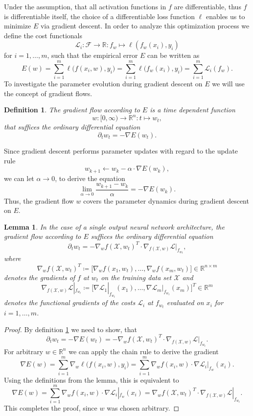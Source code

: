 \documentclass[11pt, a4paper]{article}
\newtheorem{lemma}[theorem]{Lemma}
\newtheorem{definition}[theorem]{Definition}
\newcommand{\R}{\mathds{R}}
\newcommand{\F}{\mathcal{F}}
\newcommand{\X}{\mathcal{X}}
\renewcommand{\L}{\mathcal{L}}
\begin{document}
Under the assumption, that all activation functions in $f$ are differentiable, thus $f$ is differentiable itself, the choice of a differentiable loss function $\ell$ enables us to minimize $E$ via gradient descent. In order to analyze this optimization process we define the cost functionals
\[ \L_i: \F \to \R : f_w \mapsto \ell(f_w(x_i),y_i) \]
for $i=1, \dots,m$, such that the empirical error $E$ can be written as
\[ E(w) = \sum_{i=1}^{m} \ell \big (f(x_i,w), y_i \big ) = \sum_{i=1}^{m} \ell \big (f_w(x_i), y_i \big ) = \sum_{i=1}^{m} \L_i(f_w). \]
To investigate the parameter evolution during gradient descent on $E$ we will use the concept of gradient flows.

\begin{definition} \label{def:flow}
The gradient flow according to $E$ is a time dependent function
\[ w: [0, \infty) \to \R^n : t \mapsto w_t, \]
that suffices the ordinary differential equation
\[ \partial_t w_t = - \nabla E(w_t). \]
\end{definition}

Since gradient descent performs parameter updates with regard to the update rule
\[ w_{k+1} \leftarrow w_k - \alpha \cdot \nabla E(w_k), \]
we can let $\alpha \to 0$, to derive the equation
\[ \lim_{\alpha \to 0} \frac{w_{k+1} - w_k}{\alpha} = - \nabla E(w_k). \]
Thus, the gradient flow $w$ covers the parameter dynamics during gradient descent on $E$.

\begin{lemma} \label{lem:flow}
In the case of a single output neural network architecture, the gradient flow according to $E$ suffices the ordinary differential equation
\[ \partial_tw_t = - \nabla_wf(\X, w_t)^T \cdot \nabla_{f(\X,w)} \L|_{f_{w_t}}, \]
where 
\[ \nabla_w f(\X, w_t)^T \coloneq \Big [ \nabla_wf(x_1,w_t), \dots, \nabla_wf(x_m, w_t) \Big ] \in \R^{n \times m} \]
denotes the gradients of $f$ at $w_t$ on the training data set $\X$ and 
\[ \nabla_{f(\X,w)} \L|_{f_{w_t}} \coloneq \Big [ \nabla \L_1|_{f_{w_t}}(x_1), \dots, \nabla \L_m|_{f_{w_t}}(x_m) \Big ]^T \in \R^m \]
denotes the functional gradients of the costs $\L_i$ at $f_{w_t}$ evaluated on $x_i$ for $i=1,\dots,m$.
\end{lemma}

\begin{proof}
By definition \ref{def:flow} we need to show, that
\[ \partial_t w_t = - \nabla E(w_t) = - \nabla_wf(\X, w_t)^T \cdot \nabla_{f(\X,w)} \L|_{f_{w_t}}. \]
For arbitrary $w \in \R^n$ we can apply the chain rule to derive the gradient
\[ \nabla E(w) = \sum_{i=1}^{m} \nabla_w \ell \big ( f(x_i,w), y_i \big ) = \sum_{i=1}^{m} \nabla_w f(x_i,w) \cdot \nabla \L_i |_{f_w}(x_i). \]
Using the definitions from the lemma, this is equivalent to
\[ \nabla E(w) = \sum_{i=1}^{m} \nabla_w f(x_i,w) \cdot \nabla \L_i |_{f_w}(x_i) = \nabla_wf(\X, w_t)^T \cdot \nabla_{f(\X,w)} \L|_{f_{w_t}}. \]
This completes the proof, since $w$ was chosen arbitrary.
\end{proof}
\end{document}
